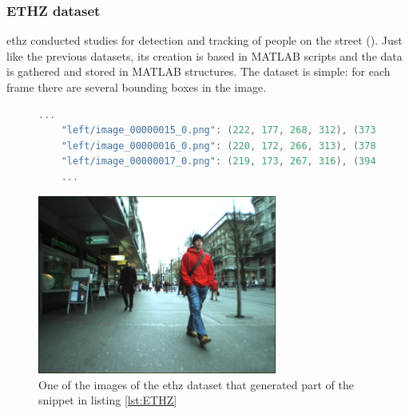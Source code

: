 \subsubsection{ETHZ dataset}
\gls{ethz} conducted studies for detection and tracking of people on the street (\cite{Ess2009}). Just like the previous datasets, its creation is based in MATLAB scripts and the data is gathered and stored in MATLAB structures. The dataset is simple: for each frame there are several bounding boxes in the image.
\begin{figure}
\begin{center}
	\begin{lstlisting}[label={lst:ETHZ}, caption={ETHZ dataset dataset file snippet.},language=c++]
	...
	"left/image_00000015_0.png": (222, 177, 268, 312), (373, 105, 463, 393), (458, 220, 487, 285), (310, 225, 327, 265), (335, 228, 352, 264), (267, 228, 281, 261);
	"left/image_00000016_0.png": (220, 172, 266, 313), (378, 407, 476, 102), (462, 219, 486, 285), (312, 223, 327, 264), (337, 226, 352, 262), (267, 231, 279, 260);
	"left/image_00000017_0.png": (219, 173, 267, 316), (394, 94, 489, 423), (313, 222, 330, 262), (338, 227, 354, 262), (267, 228, 279, 260);
	...	\end{lstlisting}
\end{center}
\end{figure}

\begin{figure}[htp]
	
	\centering
	\includegraphics[width=0.7\textwidth]{capstate/imgs/image_00000016_0.png}
	
	\caption{One of the images of the \gls{ethz} dataset that generated part of the snippet in listing \ref{lst:ETHZ} }
	\label{fig:ETHZ}
	
\end{figure}

